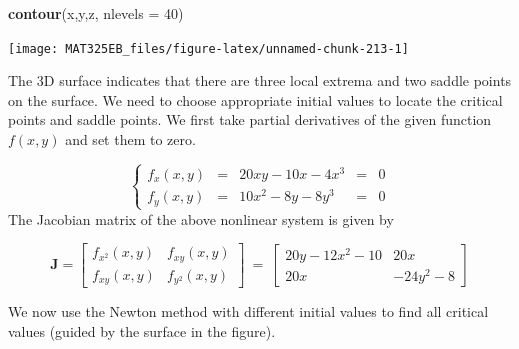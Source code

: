 \documentclass[
]{book}
\newenvironment{Shaded}{\begin{snugshade}}{\end{snugshade}}
\newcommand{\AttributeTok}[1]{\textcolor[rgb]{0.13,0.29,0.53}{#1}}
\newcommand{\DecValTok}[1]{\textcolor[rgb]{0.00,0.00,0.81}{#1}}
\newcommand{\FunctionTok}[1]{\textcolor[rgb]{0.13,0.29,0.53}{\textbf{#1}}}
\newcommand{\NormalTok}[1]{#1}
\begin{document}
\begin{Shaded}
\begin{Highlighting}[]
\FunctionTok{contour}\NormalTok{(x,y,z, }\AttributeTok{nlevels =} \DecValTok{40}\NormalTok{)}
\end{Highlighting}
\end{Shaded}

\begin{center}\texttt{[image: MAT325EB\_files/figure-latex/unnamed-chunk-213-1]} \end{center}

The 3D surface indicates that there are three local extrema and two saddle points on the surface. We need to choose appropriate initial values to locate the critical points and saddle points. We first take partial derivatives of the given function \(f(x,y)\) and set them to zero.

\[
\left\{
\begin{array}{lclcl}
f_x(x,y) & = & 20xy - 10x - 4x^3 & = & 0\\
f_y(x,y) & = & 10x^2 -8y - 8y^3 & = & 0
\end{array}
\right.
\]
The Jacobian matrix of the above nonlinear system is given by

\[
\mathbf{J} = \left[
\begin{array}{cc}
f_{x^2}(x,y) & f_{xy}(x,y) \\
f_{xy}(x,y)  & f_{y^2}(x,y)
\end{array}
\right]
~=~
\left[
\begin{array}{cc}
20y-12x^2 - 10 & 20x \\
20x  & -24y^2 - 8
\end{array}
\right]
\]

We now use the Newton method with different initial values to find all critical values (guided by the surface in the figure).
\end{document}
